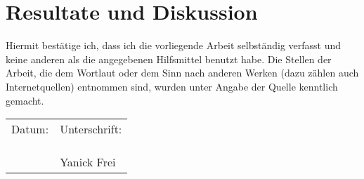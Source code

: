 \section{Resultate und Diskussion}

\vfill{
Hiermit bestätige ich, dass ich die vorliegende Arbeit selbständig verfasst und keine
anderen als die angegebenen Hilfsmittel benutzt habe. Die Stellen der Arbeit, die dem
Wortlaut oder dem Sinn nach anderen Werken (dazu zählen auch Internetquellen)
entnommen sind, wurden unter Angabe der Quelle kenntlich gemacht. 

\begin{tabular}{p{8cm}p{6cm}}
	Datum: & Unterschrift: \\ \\ \\
	\underline{\hspace{6cm}} & \underline{\hspace{6cm}} \\
	& Yanick Frei
\end{tabular}}
